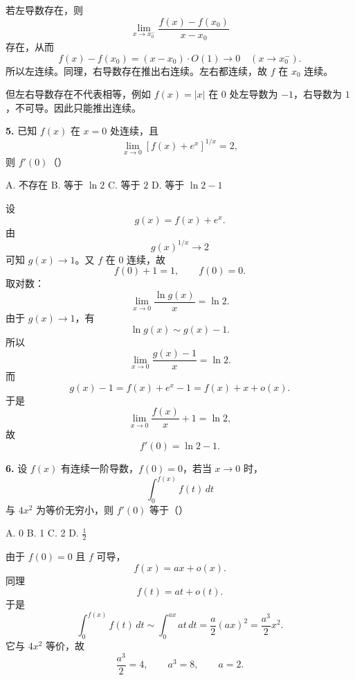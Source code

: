 \begin{solutionblock}
若左导数存在，则
\[
\lim_{x\to x_0^-}\frac{f(x)-f(x_0)}{x-x_0}
\]
存在，从而
\[
f(x)-f(x_0)=(x-x_0)\cdot O(1)\to0\quad(x\to x_0^-).
\]
所以左连续。同理，右导数存在推出右连续。左右都连续，故 \(f\) 在 \(x_0\) 连续。

但左右导数存在不代表相等，例如 \(f(x)=|x|\) 在 0 处左导数为 \(-1\)，右导数为 \(1\)，不可导。因此只能推出连续。

\end{solutionblock}

\begin{problemblock}
\textbf{5.} 已知 \(f(x)\) 在 \(x=0\) 处连续，且
\[
\lim_{x\to0}\left[f(x)+e^x\right]^{1/x}=2,
\]
则 \(f'(0)\)（\quad）

A. 不存在 \qquad B. 等于 \(\ln2\) \qquad C. 等于 \(2\) \qquad D. 等于 \(\ln2-1\)
\end{problemblock}

\begin{solutionblock}
设
\[
g(x)=f(x)+e^x.
\]
由
\[
g(x)^{1/x}\to2
\]
可知 \(g(x)\to1\)。又 \(f\) 在 0 连续，故
\[
f(0)+1=1,\qquad f(0)=0.
\]
取对数：
\[
\lim_{x\to0}\frac{\ln g(x)}x=\ln2.
\]
由于 \(g(x)\to1\)，有
\[
\ln g(x)\sim g(x)-1.
\]
所以
\[
\lim_{x\to0}\frac{g(x)-1}{x}=\ln2.
\]
而
\[
g(x)-1=f(x)+e^x-1=f(x)+x+o(x).
\]
于是
\[
\lim_{x\to0}\frac{f(x)}x+1=\ln2,
\]
故
\[
f'(0)=\ln2-1.
\]

\end{solutionblock}

\begin{problemblock}
\textbf{6.} 设 \(f(x)\) 有连续一阶导数，\(f(0)=0\)，若当 \(x\to0\) 时，
\[
\int_0^{f(x)}f(t)\,dt
\]
与 \(4x^2\) 为等价无穷小，则 \(f'(0)\) 等于（\quad）

A. 0 \qquad B. 1 \qquad C. 2 \qquad D. \(\frac12\)
\end{problemblock}

\begin{solutionblock}
由于 \(f(0)=0\) 且 \(f\) 可导，
\[
f(x)=ax+o(x).
\]
同理
\[
f(t)=at+o(t).
\]
于是
\[
\int_0^{f(x)}f(t)\,dt
\sim\int_0^{ax}at\,dt
=\frac{a}{2}(ax)^2
=\frac{a^3}{2}x^2.
\]
它与 \(4x^2\) 等价，故
\[
\frac{a^3}{2}=4,\qquad a^3=8,\qquad a=2.
\]

\end{solutionblock}

